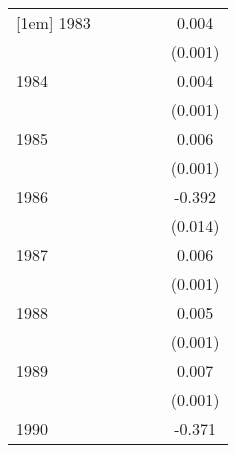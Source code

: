 {\begin{tabular}{l*{5}{c}}
[1em]
1983                &                     &                     &                     &                     &       0.004\sym{***}\\
                    &                     &                     &                     &                     &     (0.001)         \\
[1em]
1984                &                     &                     &                     &                     &       0.004\sym{***}\\
                    &                     &                     &                     &                     &     (0.001)         \\
[1em]
1985                &                     &                     &                     &                     &       0.006\sym{***}\\
                    &                     &                     &                     &                     &     (0.001)         \\
[1em]
1986                &                     &                     &                     &                     &      -0.392\sym{***}\\
                    &                     &                     &                     &                     &     (0.014)         \\
[1em]
1987                &                     &                     &                     &                     &       0.006\sym{***}\\
                    &                     &                     &                     &                     &     (0.001)         \\
[1em]
1988                &                     &                     &                     &                     &       0.005\sym{***}\\
                    &                     &                     &                     &                     &     (0.001)         \\
[1em]
1989                &                     &                     &                     &                     &       0.007\sym{***}\\
                    &                     &                     &                     &                     &     (0.001)         \\
[1em]
1990                &                     &                     &                     &                     &      -0.371\sym{***}\\

\end{tabular}}
